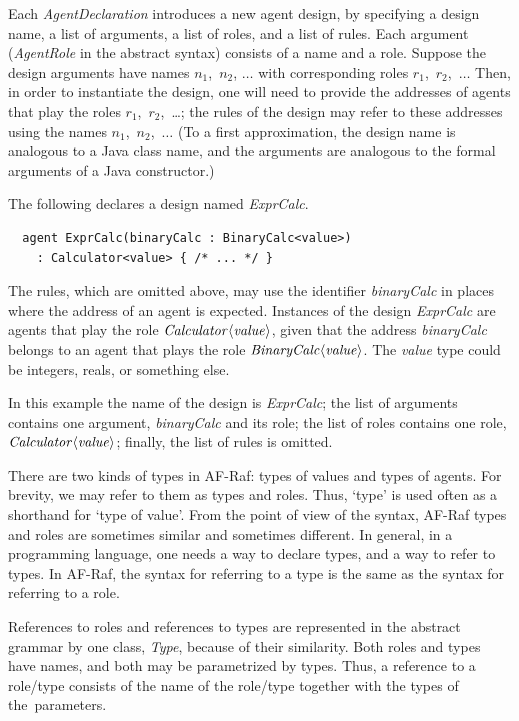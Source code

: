 \documentclass[a4paper,12pt,oneside,fleqn]{book} %
\begin{document}
Each {\it AgentDeclaration\/} introduces a new agent design, by specifying
a design name, a list of arguments, a list of roles, and a list of rules.
Each argument ({\it AgentRole\/} in the abstract syntax) consists of a name
and a role. Suppose the design arguments have names $n_1$,~$n_2$, $\ldots$
with corresponding roles $r_1$,~$r_2$,~$\ldots$ Then, in order to
instantiate the design, one will need to provide the addresses of agents
that play the roles $r_1$,~$r_2$,~\dots; the rules of the design may refer
to these addresses using the names $n_1$,~$n_2$,~$\ldots$ (To a first
approximation, the design name is analogous to a Java class name, and the
arguments are analogous to the formal arguments of a Java constructor.)

\begin{example}
The following declares a design named {\it ExprCalc}.
\begin{verbatim}
  agent ExprCalc(binaryCalc : BinaryCalc<value>)
    : Calculator<value> { /* ... */ }
\end{verbatim}
The rules, which are omitted above, may use the identifier {\it
binaryCalc\/} in places where the address of an agent is expected.
Instances of the design {\it ExprCalc\/} are agents that play the role $\it
Calculator\langle value\rangle$, given that the address {\it binaryCalc\/}
belongs to an agent that plays the role $\it BinaryCalc\langle
value\rangle$. The {\it value\/} type could be integers, reals, or
something else.

In this example the name of the design is {\it ExprCalc\/}; the list of
arguments contains one argument, {\it binaryCalc\/} and its role; the list
of roles contains one role, $\it Calculator\langle value\rangle$; finally,
the list of rules is omitted.
\end{example}

There are two kinds of types in AF-Raf: types of values and types of
agents.  For brevity, we may refer to them as types and roles. Thus, `type'
is used often as a shorthand for `type of value'. From the point of view of
the syntax, AF-Raf types and roles are sometimes similar and sometimes
different. In general, in a programming language, one needs a way to
declare types, and a way to refer to types. In AF-Raf, the syntax for
referring to a type is the same as the syntax for referring to a role.

References to roles and references to types are represented in the abstract
grammar by one class, {\it Type}, because of their similarity. Both roles
and types have names, and both may be parametrized by types. Thus, a
reference to a role/type consists of the name of the role/type together
with the types of the~parameters.
\end{document}
